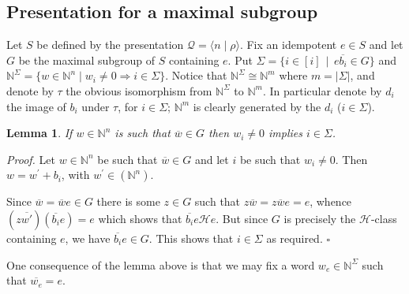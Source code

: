 \documentclass{acmconf}
\newtheorem{lemma}{Lemma}
\begin{document}
\subsection{Presentation for a maximal subgroup}\label{s:maxsubgrp}
Let $S$ be defined by the presentation 
${\mathcal Q}=\langle n\mid \rho\rangle$.
Fix an idempotent $e\in S$ and let $G$ be the maximal subgroup
of $S$ containing $e$. Put  $\Sigma=\{i\in [i]\,\mid\,e\overline{b_i}\in G\}$
and $\mathbb{N}^{\Sigma}=\{w\in\mathbb{N}^n\mid w_i\neq 0\Rightarrow i
\in\Sigma\}$. Notice that $\mathbb{N}^{\Sigma}\cong\mathbb{N}^m$
where $m=|\Sigma|$, and denote by $\tau$ the obvious
isomorphism from $\mathbb{N}^{\Sigma}$ to $\mathbb{N}^m$.
In particular denote by $d_i$ the image of $b_i$ under $\tau$,
for $i\in\Sigma$; $\mathbb{N}^m$ is clearly generated by the $d_i$
($i\in\Sigma$).

\begin{lemma}\label{gwords}
If $w\in \mathbb{N}^n$ is such that $\overline{w}\in G$ then
$w_i \neq 0$ implies $i\in\Sigma$.
\end{lemma}
\emph{Proof.}
Let $w\in \mathbb{N}^n$ be such that $\overline{w}\in G$ and let $i$ be 
such that $w_i\neq 0$. Then $w=w^{\prime}+b_i$, with $w^{\prime}\in
(\mathbb{N}^n)$.

Since $\overline{w} = \overline{w}e \in G$  there is some
$z \in G$ such that $z \overline{w} = z \overline{w} e = e$,
whence $(z \overline{w'}) (\overline{b_i} e) = e$ which shows that
$\overline{b_i} e \mathscr{H} e$. But since $G$ is precisely the 
$\mathscr{H}$-class containing $e$, we have $\overline{b_i}e \in G$.    
This shows that $i \in \Sigma$ as required.  $\square$

One consequence of the lemma above is that we may fix a 
word $w_e\in\mathbb{N}^{\Sigma}$ such that $\overline{w_e}=e$. 
\end{document}
